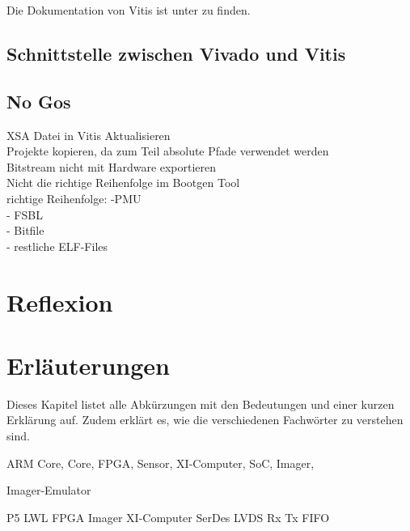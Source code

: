 \documentclass{article}
\begin{document}
Die Dokumentation von Vitis ist unter  zu finden.

\subsection{Schnittstelle zwischen Vivado und Vitis}



\subsection{No Gos}
XSA Datei in Vitis Aktualisieren\\
Projekte kopieren, da zum Teil absolute Pfade verwendet werden\\
Bitstream nicht mit Hardware exportieren\\
Nicht die richtige Reihenfolge im Bootgen Tool\\
richtige Reihenfolge: -PMU\\
- FSBL\\
- Bitfile\\
- restliche ELF-Files


\section{Reflexion}



\section{Erläuterungen}
Dieses Kapitel listet alle Abkürzungen mit den Bedeutungen und einer kurzen Erklärung auf. Zudem erklärt es, wie die verschiedenen Fachwörter zu verstehen sind.

ARM Core,
Core,
FPGA,
Sensor,
XI-Computer,
SoC,
Imager,

Imager-Emulator

P5
LWL
FPGA
Imager
XI-Computer
SerDes
LVDS
Rx
Tx
FIFO
\end{document}
